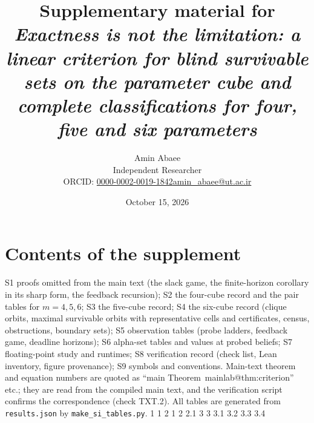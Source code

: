 \documentclass[11pt,a4paper]{article}
\makeatletter
\theoremstyle{plain}
\theoremstyle{definition}
\theoremstyle{remark}
\newcommand{\mref}[1]{\csname mainlab@#1\endcsname}
\newcommand{\meqref}[1]{(\mref{#1})}
\makeatother
\begin{document}
\title{\textbf{Supplementary material for}\\ \emph{Exactness is not the limitation: a linear criterion for blind survivable sets on the parameter cube and complete classifications for four, five and six parameters}}
\author{Amin Abaee\\[0.3em]{\small Independent Researcher}\\[0.2em]{\small ORCID: \href{https://orcid.org/0000-0002-0019-1842}{0000-0002-0019-1842}\quad \href{mailto:amin_abaee@ut.ac.ir}{amin\_abaee@ut.ac.ir}}}
\date{October 15, 2026}
\maketitle

\section*{Contents of the supplement}
S1 proofs omitted from the main text (the slack game, the finite-horizon corollary in its sharp form, the feedback recursion); S2 the four-cube record and the pair tables for $m=4,5,6$; S3 the five-cube record; S4 the six-cube record (clique orbits, maximal survivable orbits with representative cells and certificates, census, obstructions, boundary sets); S5 observation tables (probe ladders, feedback game, deadline horizons); S6 alpha-set tables and values at probed beliefs; S7 floating-point study and runtimes; S8 verification record (check list, Lean inventory, figure provenance); S9 symbols and conventions. Main-text theorem and equation numbers are quoted as ``main Theorem~\mref{thm:criterion}'' etc.; they are read from the compiled main text, and the verification script confirms the correspondence (check TXT.2). All tables are generated from \texttt{results.json} by \texttt{make\_si\_tables.py}.
\expandafter\def\csname mainlab@sec:intro\endcsname{1}
\expandafter\def\csname mainlab@tab:drift\endcsname{1}
\expandafter\def\csname mainlab@sec:model\endcsname{2}
\expandafter\def\csname mainlab@eq:drift\endcsname{1}
\expandafter\def\csname mainlab@eq:D\endcsname{2}
\expandafter\def\csname mainlab@def:blind\endcsname{2.1}
\expandafter\def\csname mainlab@sec:criterion\endcsname{3}
\expandafter\def\csname mainlab@eq:V\endcsname{3}
\expandafter\def\csname mainlab@thm:criterion\endcsname{3.1}
\expandafter\def\csname mainlab@cor:horizon\endcsname{3.2}
\expandafter\def\csname mainlab@cor:pairs\endcsname{3.3}
\expandafter\def\csname mainlab@cor:balls\endcsname{3.4}
\end{document}
